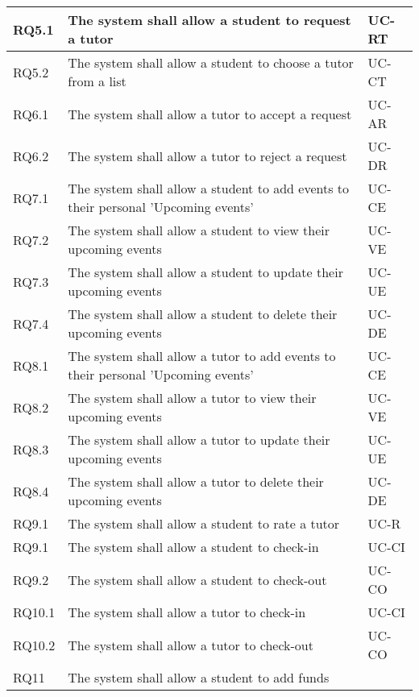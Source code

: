 \documentclass[12pt]{article}
\begin{document}
{\begin{longtable}{| l | p{10cm}| l |}
				RQ5.1 & The system shall allow a student to request a tutor & UC-RT \\ \hline
				RQ5.2 & The system shall allow a student to choose a tutor from a list & UC-CT \\ \hline

				RQ6.1 & The system shall allow a tutor to accept a request & UC-AR \\ \hline
				RQ6.2 & The system shall allow a tutor to reject a request & UC-DR \\ \hline
		

				RQ7.1 & The system shall allow a student to add events to their personal 'Upcoming events'  & UC-CE \\ \hline	
				RQ7.2 & The system shall allow a student to view their upcoming events & UC-VE \\ \hline
				RQ7.3 & The system shall allow a student to update their upcoming events & UC-UE \\ \hline
				RQ7.4 & The system shall allow a student to delete their upcoming events & UC-DE\\ \hline
				
				RQ8.1 & The system shall allow a tutor to add events to their personal 'Upcoming events'  & UC-CE \\ \hline	
				RQ8.2 & The system shall allow a tutor to view their upcoming events & UC-VE \\ \hline
				RQ8.3 & The system shall allow a tutor to update their upcoming events & UC-UE \\ \hline
				RQ8.4 & The system shall allow a tutor to delete their upcoming events & UC-DE\\ \hline
								
				RQ9.1 & The system shall allow a student to rate a tutor & UC-R\\ \hline

				RQ9.1 & The system shall allow a student to check-in  & UC-CI \\ \hline	
				RQ9.2 & The system shall allow a student to check-out  & UC-CO \\ \hline
				RQ10.1 & The system shall allow a tutor to check-in  & UC-CI \\ 
\hline	
				RQ10.2 & The system shall allow a tutor to check-out  & UC-CO \\ \hline
				RQ11 & The system shall allow a student to add funds\\ \hline
			
			
\end{longtable}
}
\end{document}
